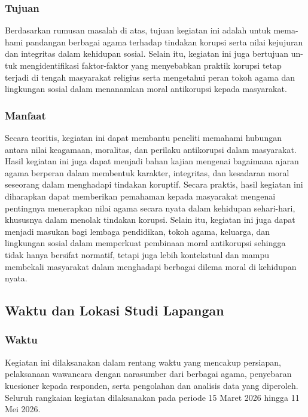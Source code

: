     \subsubsection{Tujuan}
    Berdasarkan rumusan masalah di atas, tujuan kegiatan ini adalah untuk mema-hami pandangan berbagai agama terhadap tindakan korupsi serta nilai kejujuran dan integritas dalam kehidupan sosial. Selain itu, kegiatan ini juga bertujuan un-tuk mengidentifikasi faktor-faktor yang menyebabkan praktik korupsi tetap terjadi di tengah masyarakat religius serta mengetahui peran tokoh agama dan lingkungan sosial dalam menanamkan moral antikorupsi kepada masyarakat.

    \subsubsection{Manfaat}
    Secara teoritis, kegiatan ini dapat membantu peneliti memahami hubungan antara nilai keagamaan, moralitas, dan perilaku antikorupsi dalam masyarakat. Hasil kegiatan ini juga dapat menjadi bahan kajian mengenai bagaimana ajaran agama berperan dalam membentuk karakter, integritas, dan kesadaran moral seseorang dalam menghadapi tindakan koruptif.
    Secara praktis, hasil kegiatan ini diharapkan dapat memberikan pemahaman kepada masyarakat mengenai pentingnya menerapkan nilai agama secara nyata dalam kehidupan sehari-hari, khususnya dalam menolak tindakan korupsi. Selain itu, kegiatan ini juga dapat menjadi masukan bagi lembaga pendidikan, tokoh agama, keluarga, dan lingkungan sosial dalam memperkuat pembinaan moral antikorupsi sehingga tidak hanya bersifat normatif, tetapi juga lebih kontekstual dan mampu membekali masyarakat dalam menghadapi berbagai dilema moral di kehidupan nyata. 

    
\subsection{Waktu dan Lokasi Studi Lapangan}

\subsubsection{Waktu}
Kegiatan ini dilaksanakan dalam rentang waktu yang mencakup persiapan, pelaksanaan wawancara dengan narasumber dari berbagai agama, penyebaran kuesioner kepada responden, serta pengolahan dan analisis data yang diperoleh. Seluruh rangkaian kegiatan dilaksanakan pada periode 15 Maret 2026 hingga 11 Mei 2026.

